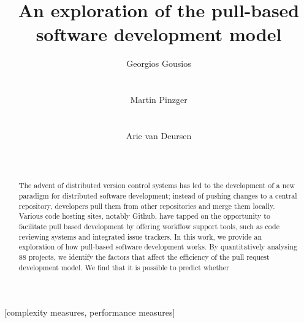\documentclass{sig-alternate}
\begin{document}
\newcommand{\todo}[1]{\textbf{TODO}\footnote{\textbf{TODO:} #1}}

\title{An exploration of the pull-based software development model}

\author{
\alignauthor
Georgios Gousios\\
       \\
       \\
\alignauthor
Martin Pinzger\\
       \\
       \\
\alignauthor
Arie van Deursen\\
       \\
       \\       
}

\maketitle

\begin{abstract}

  The advent of distributed version control systems has led to the development
  of a new paradigm for distributed software development; instead of pushing
  changes to a central repository, developers pull them from other repositories
  and merge them locally. Various code hosting sites, notably Github, have
  tapped on the opportunity to facilitate pull based development by offering
  workflow support tools, such as code reviewing systems and integrated issue
  trackers. In this work, we provide an exploration of how pull-based software
  development works. By quantitatively analysing 88 projects, we
  identify the factors that affect the efficiency of the pull request
  development model. We find that it is possible to predict whether 

\end{abstract}

[complexity measures, performance measures]
\end{document}
